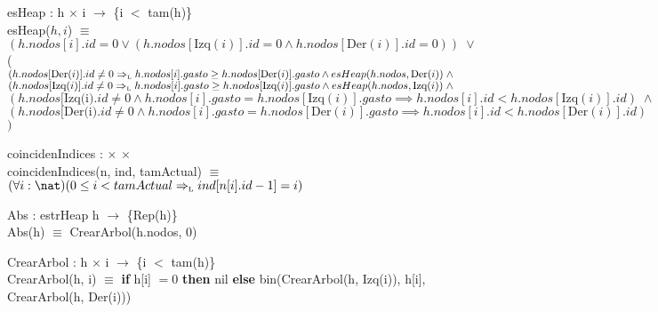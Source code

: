 \documentclass[../main.tex]{subfiles}
\begin{document}
\begin{representacion}
esHeap : \ad[nodo] h $\times$ \nat[] i $\longrightarrow$ \bool \hfill \{i $<$ tam(h)\} \\
esHeap($h, i$) $\equiv$\\
$(h.nodos[i].id = 0 \lor (h.nodos[\text{Izq}(i)].id = 0 \land h.nodos[\text{Der}(i)].id = 0)) \;\lor$ ( \vspace{2mm} \hfill \\
 $(h.nodos[\text{Der}(i)].id \neq 0 \Rightarrow_{\mathrm{\scriptscriptstyle{L}}} h.nodos[i].gasto \geq h.nodos[\text{Der}(i)].gasto \land esHeap(h.nodos, \text{Der}(i)) \;\land$ \\
 $(h.nodos[\text{Izq}(i)].id \neq 0 \Rightarrow_{\mathrm{\scriptscriptstyle{L}}} h.nodos[i].gasto \geq h.nodos[\text{Izq}(i)].gasto \land esHeap(h.nodos, \text{Izq}(i)) \;\land$ \\
 $(h.nodos[\text{Izq(i)}.id \neq 0 \land h.nodos[i].gasto = h.nodos[\text{Izq}(i)].gasto \implies h.nodos[i].id < h.nodos[\text{Izq}(i)].id) \;\land$ \\
 $(h.nodos[\text{Der(i)}.id \neq 0 \land h.nodos[i].gasto = h.nodos[\text{Der}(i)].gasto \implies h.nodos[i].id < h.nodos[\text{Der}(i)].id)$ \\
$)$

coincidenIndices : \ad[nodo] $\times$ \diccLog[\persona, \nat] $\times$ \nat \\
coincidenIndices(n, ind, tamActual) $\equiv$\\
$(\forall i: \nat) (0 \leq i < tamActual \impluego ind[n[i].id - 1] = i)$


Abs : estrHeap h $\longrightarrow$ \ab[nodo] \hfill \{Rep(h)\}\\
Abs(h) $\equiv$ CrearArbol(h.nodos, 0)

CrearArbol : \ad[nodo] h $\times$ \nat[] i $\longrightarrow$ \ab[nodo] \hfill \{i $<$ tam(h)\} \\
CrearArbol(h, i) $\equiv$ \textbf{if} h[i] $= 0$ \textbf{then} nil \textbf{else} bin(CrearArbol(h, Izq(i)), h[i], CrearArbol(h, Der(i)))
\end{representacion}
\end{document}
